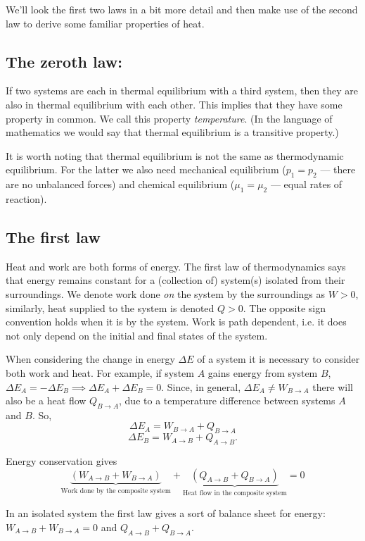 We'll look the first two laws in a bit more detail and then make use of the second law to derive some familiar properties of heat.

\subsection{The zeroth law:}
If two systems are each in thermal equilibrium with a third system, then they are also in thermal equilibrium with each other. This implies that they have some property in common. We call this property \emph{temperature}. (In the language of mathematics we would say that thermal equilibrium is a transitive property.)

It is worth noting that thermal equilibrium is not the same as thermodynamic equilibrium. For the latter we also need mechanical equilibrium ($p_1=p_2$ --- there are no unbalanced forces) and chemical equilibrium ($\mu_1=\mu_2$ --- equal rates of reaction).

\subsection{The first law}
Heat and work are both forms of energy. The first law of thermodynamics says that energy remains constant for a (collection of) system(s) isolated from their surroundings. We denote work done \emph{on} the system by the surroundings as $W>0$, similarly, heat supplied to the system is denoted $Q>0$. The opposite sign convention holds when it is by the system. Work is path dependent, i.e. it does not only depend on the initial and final states of the system.

When considering the change in energy $\Delta E$ of a system it is necessary to consider both work and heat. For example, if system $A$ gains energy from system $B$, $\Delta E_A = -\Delta E_B \implies \Delta E_A + \Delta E_B =0$. Since, in general, $\Delta E_A\neq W_{B\rightarrow A}$ there will also be a heat flow $Q_{B\rightarrow A}$, due to a temperature difference between systems $A$ and $B$.
So,
$$\Delta E_A = W_{B\rightarrow A} + Q_{B\rightarrow A}$$
$$\Delta E_B = W_{A\rightarrow B} + Q_{A\rightarrow B}.$$

Energy conservation gives 
$$\underbrace{(W_{A\rightarrow B}+W_{B\rightarrow A})}_{\text{Work done by the composite system}} + \underbrace{(Q_{A\rightarrow B}+Q_{B\rightarrow A})}_{\text{Heat flow in the composite system}} = 0$$

In an isolated system the first law gives a sort of balance sheet for energy:
$W_{A\rightarrow B}+W_{B\rightarrow A} = 0$ and $Q_{A\rightarrow B}+Q_{B\rightarrow A}$.

